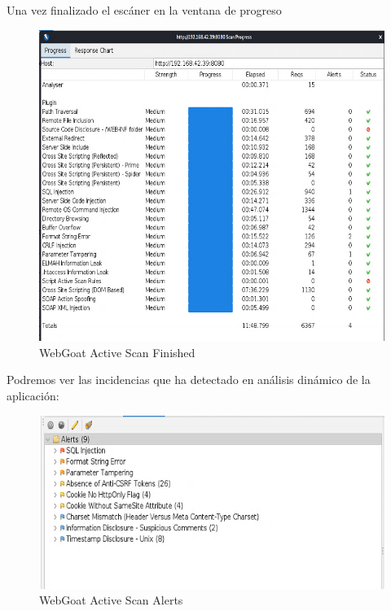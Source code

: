\newpage
Una vez finalizado el escáner en la ventana de progreso\\
\begin{figure}[!htb]
    \centering
    \captionsetup{width=1\linewidth}  
    \includegraphics[scale=0.8]{./imagenes/04_1_1_04_WebGoat_ZapProxyActiveScanResult.png}
    \caption{WebGoat Active Scan Finished}  
    \label{fig:WebGoat Active Scan Finished}
\end{figure}

Podremos ver las incidencias que ha detectado en análisis dinámico de la aplicación:\\

\begin{figure}[!htb]
    \centering
    \captionsetup{width=1\linewidth}
    \begin{center}
        \includegraphics[scale=0.8]{./imagenes/04_1_1_05_WebGoat_ZapProxyActiveScanAlert.png}
    \end{center}  
    \caption{WebGoat Active Scan Alerts}  
    \label{fig:WebGoat Active Scan Alerts}
\end{figure}

